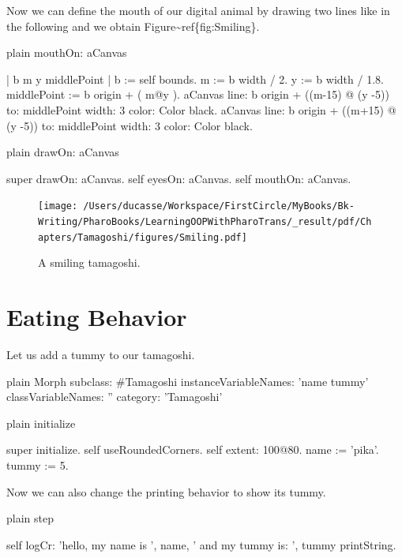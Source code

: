 \documentclass[10pt,twoside,english]{_support/latex/sbabook/sbabook}
\begin{document}
Now we can define the mouth of our digital animal by drawing two lines like in the following and we obtain Figure\textasciitilde{}ref\{fig:Smiling\}.

\begin{displaycode}{plain}
mouthOn: aCanvas

	| b m y middlePoint |
	b := self bounds.
	m := b width / 2.
	y := b width / 1.8.
	middlePoint := b origin +  ( m@y ).
	aCanvas 
		line: b origin + ((m-15) @ (y -5)) to:  middlePoint width: 3 color: Color black.
	aCanvas 
		line: b origin + ((m+15) @ (y -5)) to: middlePoint width: 3 color: Color black.
\end{displaycode}

\begin{displaycode}{plain}
drawOn: aCanvas

	super drawOn: aCanvas.
	self eyesOn: aCanvas.
	self mouthOn: aCanvas.
\end{displaycode}


\begin{figure}

\begin{center}
\texttt{[image: /Users/ducasse/Workspace/FirstCircle/MyBooks/Bk-Writing/PharoBooks/LearningOOPWithPharoTrans/\_result/pdf/Chapters/Tamagoshi/figures/Smiling.pdf]}\caption{A smiling tamagoshi.\label{Smiling}}\end{center}
\end{figure}

\section{Eating Behavior}
Let us add a tummy to our tamagoshi. 

\begin{displaycode}{plain}
Morph subclass: #Tamagoshi
	instanceVariableNames: 'name tummy'
	classVariableNames: ''
	category: 'Tamagoshi'
\end{displaycode}

\begin{displaycode}{plain}
initialize

	super initialize. 
	self useRoundedCorners.
	self extent: 100@80.
	name := 'pika'.
	tummy := 5.
\end{displaycode}

Now we can also change the printing behavior to show its tummy.

\begin{displaycode}{plain}
step

	self logCr: 'hello, my name is ', name, ' and my tummy is: ', tummy printString.
\end{displaycode}
\end{document}
